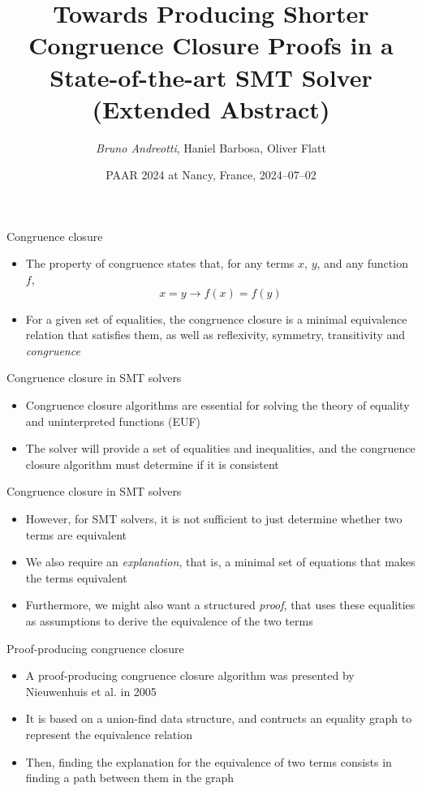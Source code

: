 \documentclass[aspectratio=169]{beamer}
\title[]{Towards Producing Shorter Congruence Closure Proofs in a State-of-the-art SMT Solver (Extended Abstract)}
\author{\emph{Bruno Andreotti}, Haniel Barbosa, Oliver Flatt}
\institute{}
\date{PAAR 2024 at Nancy, France, 2024--07--02}
\newcommand\vitem{\vfill\item}
\newcommand\pvitem{\pause\vfill\item}
\begin{document}
\begin{frame}
  \titlepage
\end{frame}

\begin{frame}{Congruence closure}
  \begin{itemize}
    \item The property of congruence states that, for any terms $x$, $y$, and
    any function $f$,
    $$x = y \rightarrow f(x) = f(y)$$
    \vitem For a given set of equalities, the congruence closure is a minimal
    equivalence relation that satisfies them, as well as reflexivity, symmetry,
    transitivity and \emph{congruence}
  \end{itemize}
\end{frame}

\begin{frame}{Congruence closure in SMT solvers}
  \begin{itemize}
    \item Congruence closure algorithms are essential for solving the theory of
    equality and uninterpreted functions (EUF)
    \vitem The solver will provide a set of equalities and inequalities, and
    the congruence closure algorithm must determine if it is consistent
  \end{itemize}
\end{frame}

\begin{frame}{Congruence closure in SMT solvers}
  \begin{itemize}
    \item However, for SMT solvers, it is not sufficient to just determine
    whether two terms are equivalent
    \vitem We also require an \textit{explanation}, that is, a minimal set of
    equations that makes the terms equivalent
    \pvitem Furthermore, we might also want a structured \textit{proof}, that
    uses these equalities as assumptions to derive the equivalence of the two
    terms
  \end{itemize}
\end{frame}

\begin{frame}{Proof-producing congruence closure}
  \begin{itemize}
    \item A proof-producing congruence closure algorithm was presented by
    Nieuwenhuis et al. in 2005~\cite{nieuwenhuis2005}
    \vitem It is based on a union-find data structure, and contructs an equality
    graph to represent the equivalence relation
    \pvitem Then, finding the explanation for the equivalence of two terms
    consists in finding a path between them in the graph
  \end{itemize}
\end{frame}
\end{document}
